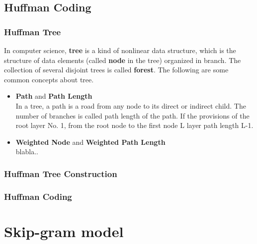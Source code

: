 \subsection{Huffman Coding}

\subsubsection{Huffman Tree}
In computer science, \textbf{tree} is a kind of nonlinear data structure, which is the structure of data elements (called \textbf{node} in the tree) organized in branch. The collection of several disjoint trees is called \textbf{forest}. The following are some common concepts about tree.
\begin{itemize}
\item \textbf{Path} and \textbf{Path Length}\\
In a tree, a path is a road from any node to its direct or indirect child. The number of branches is called path length of the path. If the provisions of the root layer No. 1, from the root node to the first node L layer path length L-1.
\item \textbf{Weighted Node} and \textbf{Weighted Path Length}\\
blabla..
\end{itemize}

\subsubsection{Huffman Tree Construction}

\subsubsection{Huffman Coding}


\section{Skip-gram model}


